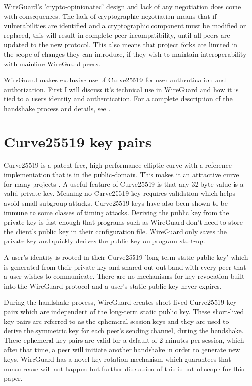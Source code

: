 \documentclass [11pt, proquest] {uwthesis}[2020/02/24]
\begin{document}
WireGuard's 'crypto-opinionated' design and lack of any negotiation does come with consequences. The lack of cryptographic negotiation means that if vulnerabilities are identified and a cryptographic component must be modified or replaced, this will result in complete peer incompatibility, until all peers are updated to the new protocol. 
This also means that project forks are limited in the scope of changes they can introduce, if they wish to maintain interoperability with mainline WireGuard peers.

WireGuard makes exclusive use of Curve25519 for user authentication and authorization. First I will discuss it's technical use in WireGuard and how it is tied to a users identity and authentication. For a complete description of the handshake process and details, see \cite{donenfeld_protocol_2018}\cite{donenfeld_wireguard_2017}.

\section{Curve25519 key pairs} \label{x25519}
Curve25519 is a patent-free, high-performance elliptic-curve with a reference implementation that is in the public-domain. This makes it an attractive curve for many projects \cite{ianix_things_2022}.
A useful feature of Curve25519 is that any 32-byte value is a valid private key. Meaning no Curve25519 key requires validation which helps avoid small subgroup attacks. Curve25519 keys have also been shown to be immune to some classes of timing attacks\cite{bernstein_safecurves_2022}\cite{sasdrich_implementing_2015}.  Deriving the public key from the private key is fast enough that programs such as WireGuard don't need to store the client's public key in their configuration file. WireGuard only saves the private key and quickly derives the public key on program start-up.

A user's identity is rooted in their Curve25519 'long-term static public key' which is generated from their private key and shared out-out-band with every peer that a user wishes to communicate.  
There are no mechanisms for key revocation built into the WireGuard protocol and a user's static public key never expires.

During the handshake process, WireGuard creates short-lived Curve25519 key pairs which are independent of the long-term static public key. These short-lived key pairs are referred to as the ephemeral session keys and they are used to derive the symmetric key for each peer's sending channel, during the handshake. 
These ephemeral key-pairs are valid for a default of 2 minutes per session, which after that time, a peer will initiate another handshake in order to generate new keys. WireGuard has a novel key rotation mechanism which guarantees that nonce-reuse will not happen but further discussion of this is out-of-scope for this paper. 
\end{document}
